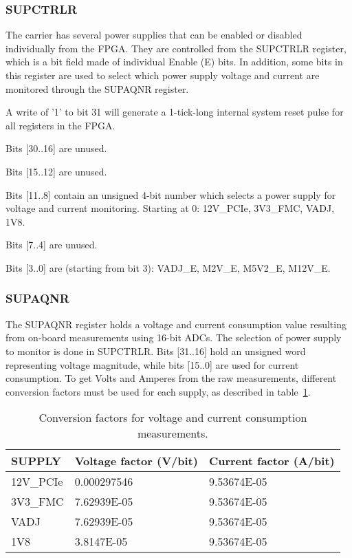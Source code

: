 \documentclass[a4paper]{article}
\newenvironment{packed_item}{
\begin{itemize}
  \setlength{\itemsep}{1pt}
  \setlength{\parskip}{0pt}
  \setlength{\parsep}{0pt}
}{\end{itemize}}
\begin{document}
\subsubsection{SUPCTRLR}
\label{sssec:supctrlr}
The carrier has several power supplies that can be enabled or disabled individually from the FPGA. They are controlled from the SUPCTRLR register, which is a bit field made of individual Enable (E) bits. In addition, some bits in this register are used to select which power supply voltage and current are monitored through the SUPAQNR register.
\begin{packed_item}
\item A write of '1' to bit 31 will generate a 1-tick-long internal system reset pulse for all registers in the FPGA. 
\item Bits [30..16] are unused.
\item Bits [15..12] are unused.
\item Bits [11..8] contain an unsigned 4-bit number which selects a power supply for voltage and current monitoring. Starting at 0: 12V\_PCIe, 3V3\_FMC, VADJ, 1V8.
\item Bits [7..4] are unused.
\item Bits [3..0] are (starting from bit 3): VADJ\_E, M2V\_E, M5V2\_E, M12V\_E.
\end{packed_item}

\subsubsection{SUPAQNR}
The SUPAQNR register holds a voltage and current consumption value resulting from on-board measurements using 16-bit ADCs. The selection of power supply to monitor is done in SUPCTRLR. Bits [31..16] hold an unsigned word representing voltage magnitude, while bits [15..0] are used for current consumption. To get Volts and Amperes from the raw measurements, different conversion factors must be used for each supply, as described in table~\ref{tab:conv_fact}.

\begin{table}[htbp]
  \centering
  \begin{tabularx}{\textwidth}{|X|l|l|}
    \hline
    \textbf{SUPPLY} & \textbf{Voltage factor (V/bit)} & \textbf{Current factor (A/bit)} \\
    \hline
    \hline
    12V\_PCIe & 0.000297546 & 9.53674E-05 \\
    \hline
    3V3\_FMC & 7.62939E-05 & 9.53674E-05 \\
    \hline
    VADJ & 7.62939E-05 & 9.53674E-05 \\
    \hline
    1V8 & 3.8147E-05 & 9.53674E-05 \\
    \hline
  \end{tabularx}
  \caption{Conversion factors for voltage and current consumption measurements.}
  \label{tab:conv_fact}
\end{table}
\end{document}
